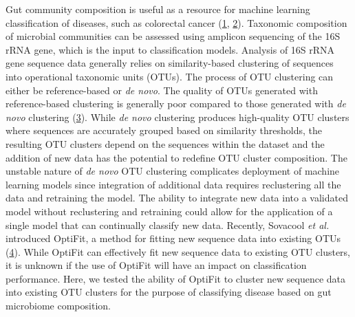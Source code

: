 \documentclass[
]{article}
\begin{document}
\newpage

Gut community composition is useful as a resource for machine learning
classification of diseases, such as colorectal cancer
(\protect\hyperlink{ref-baxter2016}{1},
\protect\hyperlink{ref-zackular2014}{2}). Taxonomic composition of
microbial communities can be assessed using amplicon sequencing of the
16S rRNA gene, which is the input to classification models. Analysis of
16S rRNA gene sequence data generally relies on similarity-based
clustering of sequences into operational taxonomic units (OTUs). The
process of OTU clustering can either be reference-based or \emph{de
novo}. The quality of OTUs generated with reference-based clustering is
generally poor compared to those generated with \emph{de novo}
clustering (\protect\hyperlink{ref-westcott2015}{3}). While \emph{de
novo} clustering produces high-quality OTU clusters where sequences are
accurately grouped based on similarity thresholds, the resulting OTU
clusters depend on the sequences within the dataset and the addition of
new data has the potential to redefine OTU cluster composition. The
unstable nature of \emph{de novo} OTU clustering complicates deployment
of machine learning models since integration of additional data requires
reclustering all the data and retraining the model. The ability to
integrate new data into a validated model without reclustering and
retraining could allow for the application of a single model that can
continually classify new data. Recently, Sovacool \emph{et al.}
introduced OptiFit, a method for fitting new sequence data into existing
OTUs (\protect\hyperlink{ref-sovacool2022}{4}). While OptiFit can
effectively fit new sequence data to existing OTU clusters, it is
unknown if the use of OptiFit will have an impact on classification
performance. Here, we tested the ability of OptiFit to cluster new
sequence data into existing OTU clusters for the purpose of classifying
disease based on gut microbiome composition.
\end{document}
